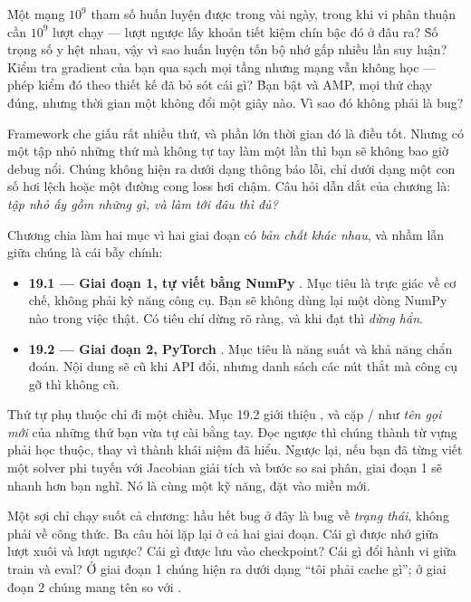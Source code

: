 \documentclass[../../deep_learning.tex]{subfiles}
\begin{document}
\begin{khoigoi}
\h{Một mạng \(10^9\) tham số huấn luyện được trong vài ngày, trong khi vi phân thuận cần \(10^9\) lượt chạy --- lượt ngược lấy khoản tiết kiệm chín bậc đó ở đâu ra?}
\h{Số trọng số y hệt nhau, vậy vì sao huấn luyện tốn bộ nhớ gấp nhiều lần suy luận?}
\h{Kiểm tra gradient của bạn qua sạch mọi tầng nhưng mạng vẫn không học --- phép kiểm đó theo thiết kế đã bỏ sót cái gì?}
\h{Bạn bật  và AMP, mọi thứ chạy đúng, nhưng thời gian một  không đổi một giây nào. Vì sao đó không phải là bug?}
\end{khoigoi}

Framework che giấu rất nhiều thứ, và phần lớn thời gian đó là điều tốt. Nhưng có một tập nhỏ những thứ mà không tự tay làm một lần thì bạn sẽ không bao giờ debug nổi. Chúng không hiện ra dưới dạng thông báo lỗi, chỉ dưới dạng một con số hơi lệch hoặc một đường cong loss hơi chậm. Câu hỏi dẫn dắt của chương là: \emph{tập nhỏ ấy gồm những gì, và làm tới đâu thì đủ?}

Chương chia làm hai mục vì hai giai đoạn có \emph{bản chất khác nhau}, và nhầm lẫn giữa chúng là cái bẫy chính:

\begin{itemize}
\item \textbf{19.1 --- Giai đoạn 1, tự viết bằng NumPy} . Mục tiêu là trực giác về cơ chế, không phải kỹ năng công cụ. Bạn sẽ không dùng lại một dòng NumPy nào trong việc thật. Có tiêu chí dừng rõ ràng, và khi đạt thì \emph{dừng hẳn}.
\item \textbf{19.2 --- Giai đoạn 2, PyTorch} . Mục tiêu là năng suất và khả năng chẩn đoán. Nội dung sẽ cũ khi API đổi, nhưng danh sách các nút thắt mà công cụ gỡ thì không cũ.
\end{itemize}

Thứ tự phụ thuộc chỉ đi một chiều. Mục 19.2 giới thiệu ,  và cặp / như \emph{tên gọi mới} của những thứ bạn vừa tự cài bằng tay. Đọc ngược thì chúng thành từ vựng phải học thuộc, thay vì thành khái niệm đã hiểu. Ngược lại, nếu bạn đã từng viết một solver phi tuyến với Jacobian giải tích và bước so sai phân, giai đoạn 1 sẽ nhanh hơn bạn nghĩ. Nó là cùng một kỹ năng, đặt vào miền mới.

Một sợi chỉ chạy suốt cả chương: hầu hết bug ở đây là bug về \emph{trạng thái}, không phải về công thức. Ba câu hỏi lặp lại ở cả hai giai đoạn. Cái gì được nhớ giữa lượt xuôi và lượt ngược? Cái gì được lưu vào checkpoint? Cái gì đổi hành vi giữa train và eval? Ở giai đoạn 1 chúng hiện ra dưới dạng ``tôi phải cache gì''; ở giai đoạn 2 chúng mang tên  so với .
\end{document}
